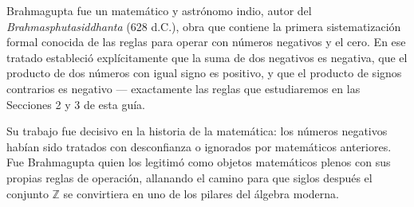 \documentclass[11pt, letterpaper]{article}
\begin{document}
\vspace{0.7cm}

\begin{tcolorbox}[enhanced, breakable,
  colback=white, colframe=blockc, colbacktitle=blockc,
  coltitle=white, arc=4pt, leftrule=5pt,
  left=10pt, right=10pt, top=12pt, bottom=10pt,
  fonttitle=\bfseries,
  attach boxed title to top left={xshift=0.5cm, yshift*=-\tcboxedtitleheight/2},
  boxed title style={colframe=blockc, colback=blockc, arc=2pt},
  title={Brahmagupta \hfill \normalfont\itshape c.\,598 -- c.\,668 d.C.}]

\begin{minipage}[t]{0.78\linewidth}
\vspace{0pt}
Brahmagupta fue un matem\'atico y astr\'onomo indio, autor del \textit{Brahmasphutasiddhanta} (628 d.C.), obra que contiene la primera sistematizaci\'on formal conocida de las reglas para operar con n\'umeros negativos y el cero. En ese tratado estableci\'o expl\'icitamente que la suma de dos negativos es negativa, que el producto de dos n\'umeros con igual signo es positivo, y que el producto de signos contrarios es negativo --- exactamente las reglas que estudiaremos en las Secciones 2 y 3 de esta gu\'ia.

\medskip
Su trabajo fue decisivo en la historia de la matem\'atica: los n\'umeros negativos hab\'ian sido tratados con desconfianza o ignorados por matem\'aticos anteriores. Fue Brahmagupta quien los legitim\'o como objetos matem\'aticos plenos con sus propias reglas de operaci\'on, allanando el camino para que siglos despu\'es el conjunto $\mathbb{Z}$ se convirtiera en uno de los pilares del \'algebra moderna.
\end{minipage}
\hfill
\begin{minipage}[t]{0.18\linewidth}
\vspace{0pt}
\end{minipage}
\end{tcolorbox}
\end{document}
